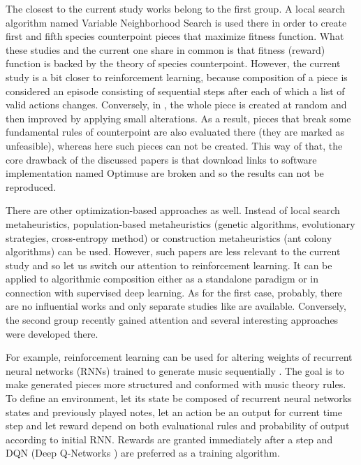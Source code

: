 \documentclass{article}
\begin{document}
The closest to the current study works \cite{herremans2012first, herremans2013fifth} belong to the first group. A local search algorithm named Variable Neighborhood Search is used there in order to create first and fifth species counterpoint pieces that maximize fitness function. What these studies and the current one share in common is that fitness (reward) function is backed by the theory of species counterpoint. However, the current study is a bit closer to reinforcement learning, because composition of a piece is considered an episode consisting of sequential steps after each of which a list of valid actions changes. Conversely, in \cite{herremans2012first, herremans2013fifth}, the whole piece is created at random and then improved by applying small alterations. As a result, pieces that break some fundamental rules of counterpoint are also evaluated there (they are marked as unfeasible), whereas here such pieces can not be created. This way of that, the core drawback of the discussed papers is that download links to software implementation named Optimuse are broken and so the results can not be reproduced.

There are other optimization-based approaches as well. Instead of local search metaheuristics, population-based metaheuristics (genetic algorithms, evolutionary strategies, cross-entropy method) or construction metaheuristics (ant colony algorithms) can be used. However, such papers are less relevant to the current study and so let us switch our attention to reinforcement learning. It can be applied to algorithmic composition either as a standalone paradigm or in connection with supervised deep learning. As for the first case, probably, there are no influential works and only separate studies like \cite{smith2012reinforcement, yi2007automatic} are available. Conversely, the second group recently gained attention and several interesting approaches were developed there.

For example, reinforcement learning can be used for altering weights of recurrent neural networks (RNNs) trained to generate music sequentially \cite{jaques2016generating, kotecha2018bach}. The goal is to make generated pieces more structured and conformed with music theory rules. To define an environment, let its state be composed of recurrent neural networks states and previously played notes, let an action be an output for current time step and let reward depend on both evaluational rules and probability of output according to initial RNN. Rewards are granted immediately after a step and DQN (Deep Q-Networks \cite{mnih2013playing}) are preferred as a training algorithm.
\end{document}
